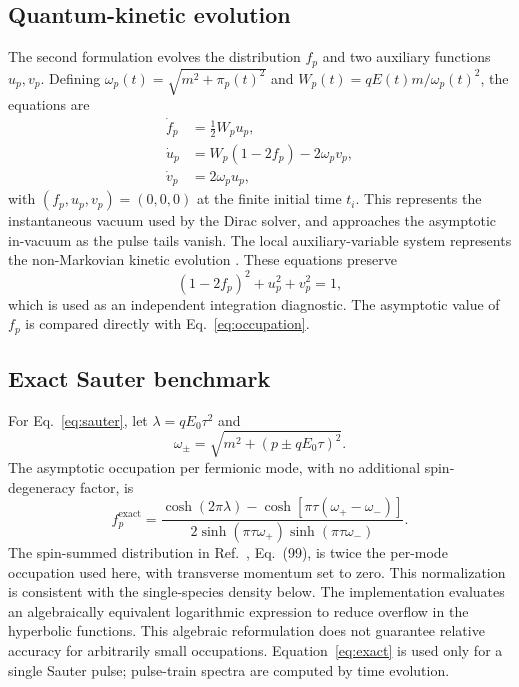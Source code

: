 \documentclass[a4paper,fleqn]{cas-dc}
\begin{document}
\subsection{Quantum-kinetic evolution}

The second formulation evolves the distribution $f_p$ and two auxiliary functions $u_p,v_p$. Defining $\omega_p(t)=\sqrt{m^2+\pi_p(t)^2}$ and $W_p(t)=qE(t)m/\omega_p(t)^2$, the equations are
\begin{align}
  \dot f_p &= \frac{1}{2}W_p u_p, \nonumber\\
  \dot u_p &= W_p(1-2f_p)-2\omega_p v_p, \label{eq:qke}\\
  \dot v_p &= 2\omega_p u_p, \nonumber
\end{align}
with $(f_p,u_p,v_p)=(0,0,0)$ at the finite initial time $t_i$. This represents the instantaneous vacuum used by the Dirac solver, and approaches the asymptotic in-vacuum as the pulse tails vanish. The local auxiliary-variable system represents the non-Markovian kinetic evolution \cite{Schmidt1998,Dumlu2009}. These equations preserve
\begin{equation}
  (1-2f_p)^2+u_p^2+v_p^2=1,
  \label{eq:invariant}
\end{equation}
which is used as an independent integration diagnostic. The asymptotic value of $f_p$ is compared directly with Eq.~\eqref{eq:occupation}.

\subsection{Exact Sauter benchmark}

For Eq.~\eqref{eq:sauter}, let $\lambda=qE_0\tau^2$ and
\begin{equation}
  \omega_{\pm}=\sqrt{m^2+(p\pm qE_0\tau)^2}.
\end{equation}
The asymptotic occupation per fermionic mode, with no additional spin-degeneracy factor, is \cite{Hebenstreit2010}
\begin{equation}
  f_p^{\mathrm{exact}}=
  \frac{\cosh(2\pi\lambda)-
  \cosh\!\left[\pi\tau(\omega_+-\omega_-)\right]}
  {2\sinh(\pi\tau\omega_+)\sinh(\pi\tau\omega_-)}.
  \label{eq:exact}
\end{equation}
The spin-summed distribution in Ref.~\cite{Hebenstreit2010}, Eq.~(99), is twice the per-mode occupation used here, with transverse momentum set to zero. This normalization is consistent with the single-species density below. The implementation evaluates an algebraically equivalent logarithmic expression to reduce overflow in the hyperbolic functions. This algebraic reformulation does not guarantee relative accuracy for arbitrarily small occupations. Equation~\eqref{eq:exact} is used only for a single Sauter pulse; pulse-train spectra are computed by time evolution.
\end{document}
